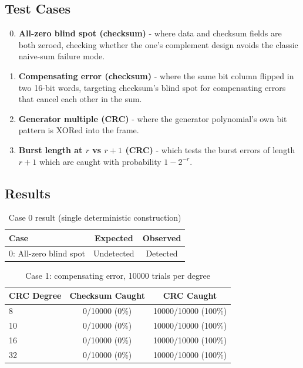 \documentclass[10pt]{article}
\begin{document}
\subsection{Test Cases}

\begin{enumerate}[label=\arabic*)]
\setcounter{enumi}{-1}
\item \textbf{All-zero blind spot (checksum)} - where data and checksum
fields are both zeroed, checking whether the one's complement design avoids
the classic naive-sum failure mode.
\item \textbf{Compensating error (checksum)} - where the same bit column
flipped in two 16-bit words, targeting checksum's blind spot for
compensating errors that cancel each other in the sum.
\item \textbf{Generator multiple (CRC)} - where the generator polynomial's
own bit pattern is XORed into the frame.
\item \textbf{Burst length at $r$ vs $r+1$ (CRC)} - which tests the burst errors of
length $r+1$ which are caught with probability $1-2^{-r}$.
\end{enumerate}

\subsection{Results}

\begin{table}[htbp]
\centering
\begin{tabular}{lcc}
\toprule
Case & Expected & Observed \\
\midrule
0: All-zero blind spot & Undetected & Detected \\
\bottomrule
\end{tabular}
\caption{Case 0 result (single deterministic construction)}
\end{table}

\begin{table}[htbp]
\centering
\begin{tabular}{lcc}
\toprule
CRC Degree & Checksum Caught & CRC Caught \\
\midrule
8  & 0/10000 (0\%)   & 10000/10000 (100\%) \\
10 & 0/10000 (0\%)   & 10000/10000 (100\%) \\
16 & 0/10000 (0\%)   & 10000/10000 (100\%) \\
32 & 0/10000 (0\%)   & 10000/10000 (100\%) \\
\bottomrule
\end{tabular}
\caption{Case 1: compensating error, 10000 trials per degree}
\end{table}
\end{document}
